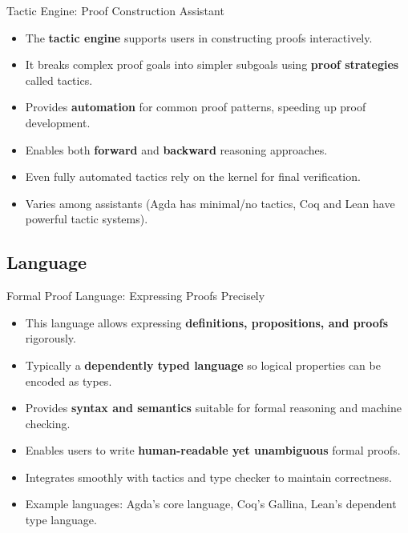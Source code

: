 \documentclass[aspectratio=169, 12pt]{beamer}
\begin{document}
\begin{frame}{Tactic Engine: Proof Construction Assistant}
\begin{itemize}
    \item The \textbf{tactic engine} supports users in constructing proofs interactively.
    \item It breaks complex proof goals into simpler subgoals using \textbf{proof strategies} called tactics.
    \item Provides \textbf{automation} for common proof patterns, speeding up proof development.
    \item Enables both \textbf{forward} and \textbf{backward} reasoning approaches.
    \item Even fully automated tactics rely on the kernel for final verification.
    \item Varies among assistants (Agda has minimal/no tactics, Coq and Lean have powerful tactic systems).
\end{itemize}
\end{frame}
\subsection*{ Language}

\begin{frame}{Formal Proof Language: Expressing Proofs Precisely}
\begin{itemize}
    \item This language allows expressing \textbf{definitions, propositions, and proofs} rigorously.
    \item Typically a \textbf{dependently typed language} so logical properties can be encoded as types.
    \item Provides \textbf{syntax and semantics} suitable for formal reasoning and machine checking.
    \item Enables users to write \textbf{human-readable yet unambiguous} formal proofs.
    \item Integrates smoothly with tactics and type checker to maintain correctness.
    \item Example languages: Agda’s core language, Coq’s Gallina, Lean’s dependent type language.
\end{itemize}
\end{frame}
\end{document}
